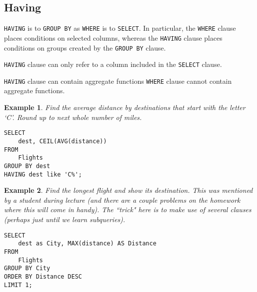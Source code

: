 \documentclass{article}
\newtheorem{example}{Example}
\begin{document}
  

\subsection*{Having}

 \texttt{HAVING} is to \texttt{GROUP BY} as \texttt{WHERE} is to \texttt{SELECT}.
In particular, the \texttt{WHERE} clause places conditions on selected columns,
whereas the \texttt{HAVING} clause places conditions on groups created by
the \texttt{GROUP BY} clause.  


\begin{outline}
 
    \1 \texttt{HAVING} clause can only refer to a column included in the \texttt{SELECT} clause.

    \1 \texttt{HAVING} clause can contain aggregate functions
        \2 \texttt{WHERE} clause cannot contain aggregate functions.  
   
\end{outline}
 
  
\begin{example}
Find the average distance by destinations that start with the letter `C'.
Round up to next whole number of miles.\end{example} 
 
 
\begin{lstlisting}[frame=single]
SELECT 
    dest, CEIL(AVG(distance))
FROM
    Flights
GROUP BY dest
HAVING dest like 'C%';  
\end{lstlisting}  
\vspace{-0.5cm}
 


 
  
\begin{example}
Find the longest flight and show its destination. This was mentioned by a student during lecture (and there are a couple problems on the homework where this will come in handy).  The ``trick" here is to make use of several clauses (perhaps just until we learn subqueries).  
\end{example} 
 
 
\begin{lstlisting}[frame=single]
SELECT 
    dest as City, MAX(distance) AS Distance
FROM
    Flights
GROUP BY City
ORDER BY Distance DESC
LIMIT 1;
\end{lstlisting}  
\vspace{-0.5cm}
  
  
\end{document}
